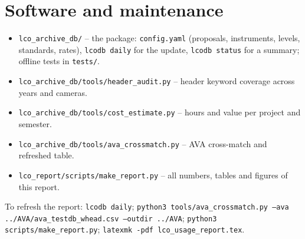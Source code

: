 \chapter{Software and maintenance}\label{sec:software}
\begin{itemize}\setlength{\itemsep}{1pt}
\item \texttt{lco\_archive\_db/} -- the \lcodb{} package: \texttt{config.yaml} (proposals, instruments, levels,
  standards, rates), \texttt{lcodb daily} for the update, \texttt{lcodb status} for a summary; offline tests in
  \texttt{tests/}.
\item \texttt{lco\_archive\_db/tools/header\_audit.py} -- header keyword coverage across years and cameras.
\item \texttt{lco\_archive\_db/tools/cost\_estimate.py} -- hours and value per project and semester.
\item \texttt{lco\_archive\_db/tools/ava\_crossmatch.py} -- AVA cross-match and refreshed table.
\item \texttt{lco\_report/scripts/make\_report.py} -- all numbers, tables and figures of this report.
\end{itemize}
To refresh the report: \texttt{lcodb daily}; \texttt{python3 tools/ava\_crossmatch.py --ava ../AVA/ava\_testdb\_whead.csv
--outdir ../AVA}; \texttt{python3 scripts/make\_report.py}; \texttt{latexmk -pdf lco\_usage\_report.tex}.
